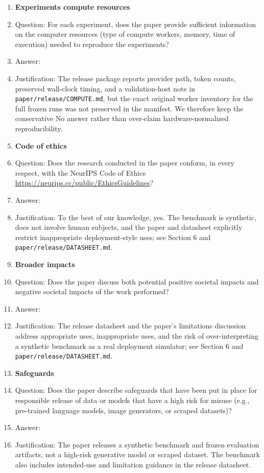 \begin{enumerate}
\item {\bf Experiments compute resources}
    \item[] Question: For each experiment, does the paper provide sufficient information on the computer resources (type of compute workers, memory, time of execution) needed to reproduce the experiments?
    \item[] Answer: \answerNo{}
    \item[] Justification: The release package reports provider path, token counts, preserved wall-clock timing, and a validation-host note in \texttt{paper/release/COMPUTE.md}, but the exact original worker inventory for the full frozen runs was not preserved in the manifest. We therefore keep the conservative No answer rather than over-claim hardware-normalized reproducibility.

\item {\bf Code of ethics}
    \item[] Question: Does the research conducted in the paper conform, in every respect, with the NeurIPS Code of Ethics \url{https://neurips.cc/public/EthicsGuidelines}?
    \item[] Answer: \answerYes{}
    \item[] Justification: To the best of our knowledge, yes. The benchmark is synthetic, does not involve human subjects, and the paper and datasheet explicitly restrict inappropriate deployment-style uses; see Section 6 and \texttt{paper/release/DATASHEET.md}.

\item {\bf Broader impacts}
    \item[] Question: Does the paper discuss both potential positive societal impacts and negative societal impacts of the work performed?
    \item[] Answer: \answerYes{}
    \item[] Justification: The release datasheet and the paper's limitations discussion address appropriate uses, inappropriate uses, and the risk of over-interpreting a synthetic benchmark as a real deployment simulator; see Section 6 and \texttt{paper/release/DATASHEET.md}.

\item {\bf Safeguards}
    \item[] Question: Does the paper describe safeguards that have been put in place for responsible release of data or models that have a high risk for misuse (e.g., pre-trained language models, image generators, or scraped datasets)?
    \item[] Answer: \answerNA{}
    \item[] Justification: The paper releases a synthetic benchmark and frozen evaluation artifacts, not a high-risk generative model or scraped dataset. The benchmark also includes intended-use and limitation guidance in the release datasheet.


\end{enumerate}
